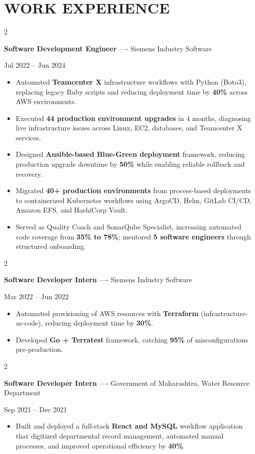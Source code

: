 \documentclass[10pt, letterpaper]{article}
\newenvironment{highlights}{
    \begin{itemize}[
        topsep=0.10 cm,
        parsep=0.06 cm,
        partopsep=0pt,
        itemsep=0.06 cm,
        leftmargin=12pt
    ]
}{
    \end{itemize}
}
\newenvironment{twocolentry}[2][]{
    \onecolentry
    \def\secondColumn{#2}
    \setcolumnwidth{\fill, 4.5 cm}
    \begin{paracol}{2}
}{
    \switchcolumn \raggedleft \secondColumn
    \end{paracol}
    \endonecolentry
}
\begin{document}
\section{WORK EXPERIENCE}
\begin{twocolentry}{Jul 2022 -- Jun 2024}
\textbf{Software Development Engineer} ---- Siemens Industry Software
\end{twocolentry}
\begin{highlights}
  \item Automated \textbf{Teamcenter X} infrastructure workflows with Python (Boto3), replacing legacy Ruby scripts and reducing deployment time by \textbf{40\%} across AWS environments.
  \item Executed \textbf{44 production environment upgrades} in 4 months, diagnosing live infrastructure issues across Linux, EC2, databases, and Teamcenter X services.
  \item Designed \textbf{Ansible-based Blue-Green deployment} framework, reducing production upgrade downtime by \textbf{50\%} while enabling reliable rollback and recovery.
  \item Migrated \textbf{40+ production environments} from process-based deployments to containerized Kubernetes workflows using ArgoCD, Helm, GitLab CI/CD, Amazon EFS, and HashiCorp Vault.
  \item Served as Quality Coach and SonarQube Specialist, increasing automated code coverage from \textbf{35\% to 78\%}; mentored \textbf{5 software engineers} through structured onboarding.
\end{highlights}

\vspace{0.15 cm}

\begin{twocolentry}{Mar 2022 -- Jun 2022}
\textbf{Software Developer Intern} ---- Siemens Industry Software
\end{twocolentry}
\begin{highlights}
  \item Automated provisioning of AWS resources with \textbf{Terraform} (infrastructure-as-code), reducing deployment time by \textbf{30\%}.
  \item Developed \textbf{Go + Terratest} framework, catching \textbf{95\%} of misconfigurations pre-production.
\end{highlights}

\vspace{0.15 cm}

\begin{twocolentry}{Sep 2021 -- Dec 2021}
\textbf{Software Developer Intern} ---- Government of Maharashtra, Water Resource Department
\end{twocolentry}
\begin{highlights}
  \item Built and deployed a full-stack \textbf{React and MySQL} workflow application that digitized departmental record management, automated manual processes, and improved operational efficiency by \textbf{40\%}.
\end{highlights}
\end{document}
